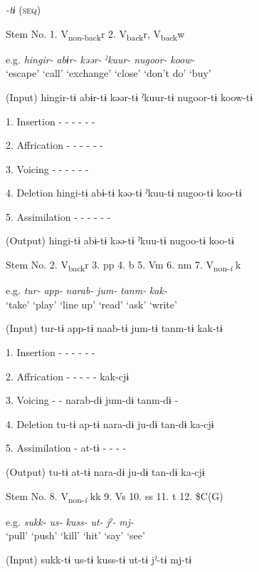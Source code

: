 \begin{table}
\caption{\label{tab:key:61}. Verbal stems +} \textmd{\textit{-tɨ}}\textmd{ (\textsc{seq})}

Stem No.  1. V\textsubscript{non-back}r  2. V\textsubscript{back}r, V\textsubscript{back}w

  e.g.  \textit{hingir-}  \textit{abɨr-}  \textit{kəər-}  \textit{ˀkuur-}  \textit{nugoor-}  \textit{koow-}\\
\glt ‘escape’  ‘call’  ‘exchange’  ‘close’  ‘don’t do’  ‘buy’

  (Input)  hingir-tɨ  abɨr-tɨ  kəər-tɨ  ˀkuur-tɨ  nugoor-tɨ  koow-tɨ

1.  Insertion  -  -  -  -  -  -

2.  Affrication  -  -  -  -  -  -

3.  Voicing  -  -  -  -  -  -

4.  Deletion  hingi-tɨ  abɨ-tɨ  kəə-tɨ  ˀkuu-tɨ  nugoo-tɨ  koo-tɨ

5.  Assimilation  -  -  -  -  -  -

  (Output)  hingi-tɨ  abɨ-tɨ  kəə-tɨ  ˀkuu-tɨ  nugoo-tɨ  koo-tɨ

Stem No.  2. V\textsubscript{back}r  3. pp  4. b  5. Vm  6. nm  7. V\textsubscript{non-}\textit{\textsubscript{i} }k

  e.g.  \textit{tur-}  \textit{app-}  \textit{narab-}  \textit{jum-}  \textit{tanm-}  \textit{kak-}\\
\glt ‘take’  ‘play’  ‘line up’  ‘read’  ‘ask’  ‘write’

  (Input)  tur-tɨ  app-tɨ  naab-tɨ  jum-tɨ  tanm-tɨ  kak-tɨ

1.  Insertion  -  -  -  -  -  -

2.  Affrication  -  -  -  -  -  kak-cjɨ

3.  Voicing  -  -  narab-dɨ  jum-dɨ  tanm-dɨ  -

4.  Deletion  tu-tɨ  ap-tɨ  nara-dɨ  ju-dɨ  tan-dɨ  ka-cjɨ

5.  Assimilation  -  at-tɨ  -  -  -  -

  (Output)  tu-tɨ  at-tɨ  nara-dɨ  ju-dɨ  tan-dɨ  ka-cjɨ

  Stem No.  8. V\textsubscript{non-}\textit{\textsubscript{i} }kk  9. Vs  10. ss  11. t  12. \$C(G)

  e.g.  \textit{sukk-}  \textit{us-}  \textit{kuss-}  \textit{ut-}  \textit{jˀ-}  \textit{mj-}\\
\glt ‘pull’  ‘push’  ‘kill’  ‘hit’  ‘say’  ‘see’

  (Input)  sukk-tɨ  us-tɨ  kuss-tɨ  ut-tɨ  jˀ-tɨ  mj-tɨ


\end{table}
